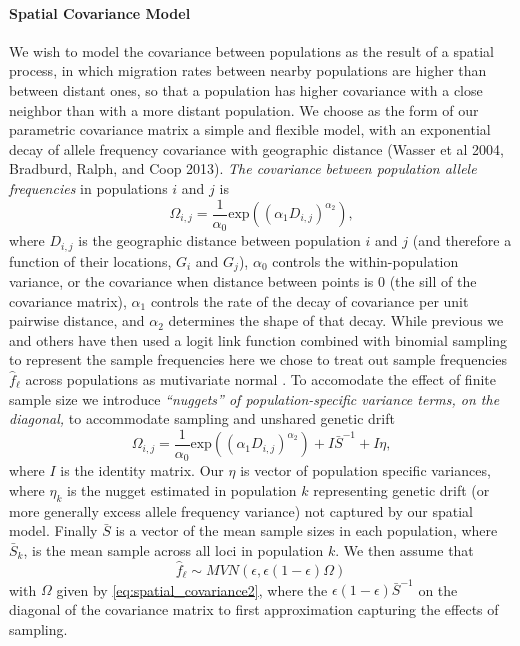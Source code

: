 \documentclass[12pt]{article}
\newcommand{\gc}[1]{{\em \color{blue} #1}}
\begin{document}
\paragraph{Spatial Covariance Model}
We wish to model the covariance between populations as the result of a spatial process, in which migration rates between nearby populations are higher than between distant ones, so that a population has higher covariance with a close neighbor than with a more distant population.  We choose as the form of our parametric covariance matrix a simple and flexible model, with an exponential decay of allele frequency covariance with geographic distance (Wasser et al 2004, Bradburd, Ralph, and Coop 2013).  \gc{The covariance between population allele frequencies} in populations $i$ and $j$ is 
\begin{equation}
\label{eq:spatial_covariance}
\Omega_{i,j} = \frac{1}{\alpha_0} \text{exp} \left(	\left( \alpha_1D_{i,j} \right)^{\alpha_2} \right) \text{,}
\end{equation}
where $D_{i,j}$ is the geographic distance between population $i$ and $j$ (and therefore a function of their locations, $G_i$ and $G_j$), $\alpha_0$ controls the within-population variance, or the covariance when distance between points is 0 (the sill of the covariance matrix),  $\alpha_1$ controls the rate of the decay of covariance per unit pairwise distance, and $\alpha_2$ determines the shape of that decay. While previous we and others have then used a logit link function combined with binomial sampling to represent the sample frequencies \citep{Wasser, Bradburd} here we chose to treat out sample frequencies $\hat{f}_{\ell}$ across populations as mutivariate normal \citep[]{Treemix}. To accomodate the effect of finite sample size 
 we introduce \gc{``nuggets'' of population-specific variance terms, on the diagonal,} to accommodate sampling and unshared genetic drift  
\begin{equation}
\label{eq:spatial_covariance2}
\Omega_{i,j} = \frac{1}{\alpha_0} \text{exp} \left(	\left( \alpha_1D_{i,j} \right)^{\alpha_2} \right) + I\bar{S}^{-1} + I\eta \text{,}
\end{equation}
where $I$ is the identity matrix. Our $\eta$ is vector of population specific variances, where $\eta_k$ is the nugget estimated in population $k$ representing genetic drift (or more generally excess allele frequency variance) not captured by our spatial model. Finally $\bar{S}$ is a vector of the mean sample sizes in each population, where $\bar{S}_k$, is the mean sample across all loci in population $k$.  We then assume that
\begin{equation}
\hat{f}_{\ell} \sim MVN(\epsilon, \epsilon (1-\epsilon)\Omega)
\end{equation}
with $\Omega$ given by \ref{eq:spatial_covariance2},  where the $\epsilon(1-\epsilon)  \bar{S}^{-1}$ on the diagonal of the covariance matrix to first approximation capturing the effects of sampling. 
\end{document}
